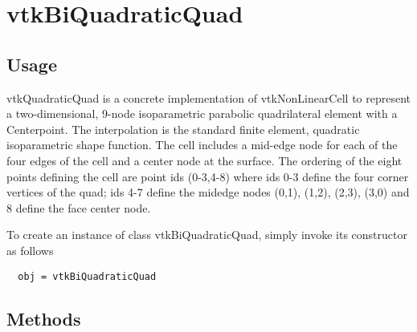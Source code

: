 \section{vtkBiQuadraticQuad}

\subsection{Usage}

 vtkQuadraticQuad is a concrete implementation of vtkNonLinearCell to
 represent a two-dimensional, 9-node isoparametric parabolic quadrilateral
 element with a Centerpoint. The interpolation is the standard finite
 element, quadratic isoparametric shape function. The cell includes a
 mid-edge node for each of the four edges of the cell and a center node at
 the surface. The ordering of the eight points defining the cell are point
 ids (0-3,4-8) where ids 0-3 define the four corner vertices of the quad;
 ids 4-7 define the midedge nodes (0,1), (1,2), (2,3), (3,0) and 8 define
 the face center node.


To create an instance of class vtkBiQuadraticQuad, simply
invoke its constructor as follows
\begin{verbatim}
  obj = vtkBiQuadraticQuad
\end{verbatim}
\subsection{Methods}

